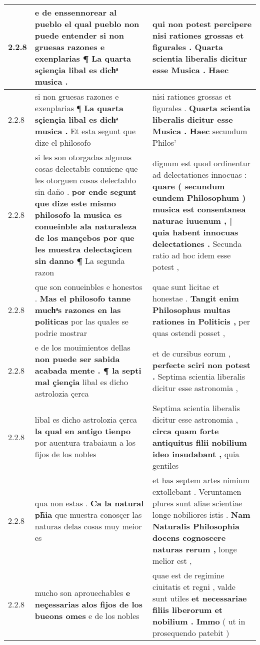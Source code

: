 \begin{tabular}{|p{1cm}|p{6.5cm}|p{6.5cm}|}
2.2.8 & e de enssennorear al pueblo el qual pueblo non puede entender \textbf{ si non gruesas razones e exenplarias ¶ } La quarta sçiençia libal es dichͣ musica . & qui non potest percipere \textbf{ nisi rationes grossas et figurales . } Quarta scientia liberalis dicitur esse Musica . Haec \\\hline
2.2.8 & si non gruesas razones e exenplarias ¶ \textbf{ La quarta sçiençia libal es dichͣ musica . } Et esta segunt que dize el philosofo & nisi rationes grossas et figurales . \textbf{ Quarta scientia liberalis dicitur esse Musica . Haec } secundum Philos’ \\\hline
2.2.8 & si les son otorgadas algunas cosas delectabłs conuiene que les otorguen cosas delectabło sin daño . \textbf{ por ende segunt que dize este mismo philosofo la musica es conueinble ala naturaleza de los mançebos por que les muestra delectaçicen sin danno ¶ } La segunda razon & dignum est quod ordinentur ad delectationes innocuas : \textbf{ quare ( secundum eundem Philosophum ) musica est consentanea naturae iuuenum , | quia habent innocuas delectationes . } Secunda ratio ad hoc idem esse potest , \\\hline
2.2.8 & que son conueinbles e honestos . \textbf{ Mas el philosofo tanne muchͣs razones en las politicas } por las quales se podrie mostrar & quae sunt licitae et honestae . \textbf{ Tangit enim Philosophus multas rationes in Politicis , } per quas ostendi posset , \\\hline
2.2.8 & e de los mouimientos dellas \textbf{ non puede ser sabida acabada mente . ¶ la septi mal çiençia } libal es dicho astrolozia çerca & et de cursibus eorum , \textbf{ perfecte sciri non potest . } Septima scientia liberalis dicitur esse astronomia , \\\hline
2.2.8 & libal es dicho astrolozia çerca \textbf{ la qual en antigo tienpo } por auentura trabaiaun a los fijos de los nobles & Septima scientia liberalis dicitur esse astronomia , \textbf{ circa quam forte antiquitus filii nobilium ideo insudabant , } quia gentiles \\\hline
2.2.8 & qua non estas . \textbf{ Ca la natural ph̃ia } que muestra conosçer las naturas delas cosas muy meior es & et has septem artes nimium extollebant . Veruntamen plures sunt aliae scientiae longe nobiliores istis . \textbf{ Nam Naturalis Philosophia docens cognoscere naturas rerum , } longe melior est , \\\hline
2.2.8 & mucho son aprouechables \textbf{ e neçessarias alos fijos de los bueons omes } e de los nobles & quae est de regimine ciuitatis et regni , valde sunt utiles \textbf{ et necessariae filiis liberorum et nobilium . Immo } ( ut in prosequendo patebit ) \\\hline

\end{tabular}
